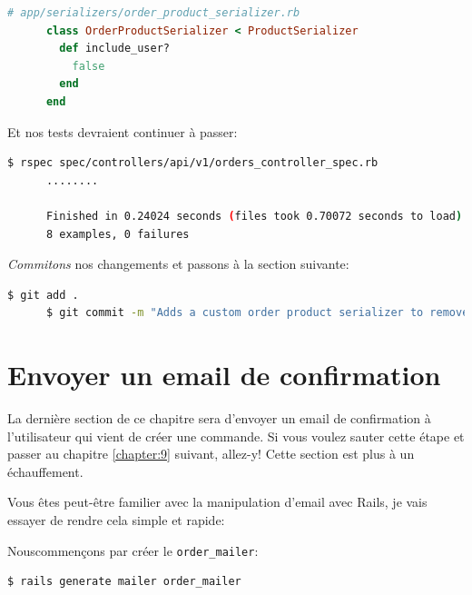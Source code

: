 \documentclass[]{report}
\begin{document}
    \begin{scriptsize}
      \begin{lstlisting}[language=ruby]
      # app/serializers/order_product_serializer.rb
      class OrderProductSerializer < ProductSerializer
        def include_user?
          false
        end
      end
      \end{lstlisting}
    \end{scriptsize}

    Et nos tests devraient continuer à passer:

    \begin{scriptsize}
      \begin{lstlisting}[language=bash]
      $ rspec spec/controllers/api/v1/orders_controller_spec.rb
      ........

      Finished in 0.24024 seconds (files took 0.70072 seconds to load)
      8 examples, 0 failures
      \end{lstlisting}
    \end{scriptsize}

    \textit{Commitons} nos changements et passons à la section suivante:

    \begin{scriptsize}
      \begin{lstlisting}[language=bash]
      $ git add .
      $ git commit -m "Adds a custom order product serializer to remove the user association"
      \end{lstlisting}
    \end{scriptsize}

  \section{Envoyer un email de confirmation}

    La dernière section de ce chapitre sera d'envoyer un email de confirmation à l'utilisateur qui vient de créer une commande. Si vous voulez sauter cette étape et passer au chapitre \ref{chapter:9} suivant, allez-y! Cette section est plus à un échauffement.

    Vous êtes peut-être familier avec la manipulation d'email avec Rails, je vais essayer de rendre cela simple et rapide:

    Nouscommençons par créer le \verb|order_mailer|:

    \begin{scriptsize}
      \begin{lstlisting}[language=bash]
      $ rails generate mailer order_mailer
      \end{lstlisting}
    \end{scriptsize}
\end{document}
